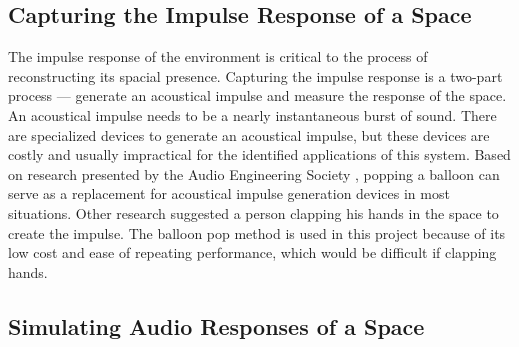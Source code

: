 \documentclass[letterpaper, 11pt, onecolumn, oneside]{article}
\begin{document}
    \subsection*{Capturing the Impulse Response of a Space}
    The impulse response of the environment is critical to the process of reconstructing its spacial presence.
    Capturing the impulse response is a two-part process --- generate an acoustical impulse and measure the response of the space.
    An acoustical impulse needs to be a nearly instantaneous burst of sound.
    There are specialized devices to generate an acoustical impulse, but these devices are costly and usually impractical for the identified applications of this system.
    Based on research presented by the Audio Engineering Society \cite{abel2010estimating}, popping a balloon can serve as a replacement for acoustical impulse generation devices in most situations.
    Other research suggested a person clapping his hands in the space to create the impulse.
    The balloon pop method is used in this project because of its low cost and ease of repeating performance, which would be difficult if clapping hands.

    \subsection*{Simulating Audio Responses of a Space}

\end{document}
